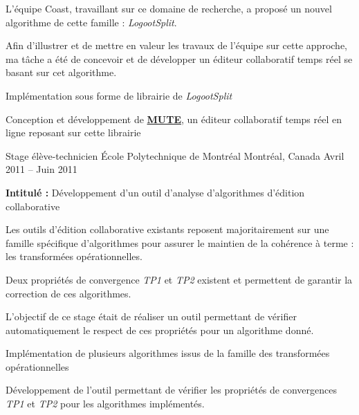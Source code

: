 \documentclass[12pt, a4paper]{awesome-cv}
\begin{document}
\begin{cventries}
\begin{cvparagraph}
    L'équipe Coast, travaillant sur ce domaine de recherche, a proposé un nouvel algorithme de cette famille : \emph{LogootSplit}.

    Afin d'illustrer et de mettre en valeur les travaux de l'équipe sur cette approche,
    ma tâche a été de concevoir et de développer un éditeur collaboratif temps réel se basant sur cet algorithme.

    \begin{tightemize}
      \item Implémentation sous forme de librairie de \emph{LogootSplit}
      \item Conception et développement de \href{https://www.coedit.re}{\textbf{MUTE}}, un éditeur collaboratif temps réel en ligne reposant sur cette librairie
    \end{tightemize}
  \end{cvparagraph}

\cventry
  {Stage élève-technicien} %
  {École Polytechnique de Montréal} %
  {Montréal, Canada} %
  {Avril 2011 – Juin 2011} %
  {
    \begin{cvitems} %
      \item {\textbf{Intitulé :}  Développement d’un outil d'analyse d'algorithmes d'édition collaborative}
    \end{cvitems}
  }

\begin{cvparagraph}
  Les outils d'édition collaborative existants reposent majoritairement sur une famille spécifique d'algorithmes pour assurer le maintien de la cohérence à terme : les transformées opérationnelles.

  Deux propriétés de convergence \emph{TP1} et \emph{TP2} existent et permettent de garantir la correction de ces algorithmes.

  L'objectif de ce stage était de réaliser un outil permettant de vérifier automatiquement le respect de ces propriétés pour un algorithme donné.
  \begin{tightemize}
    \item Implémentation de plusieurs algorithmes issus de la famille des transformées opérationnelles
    \item Développement de l'outil permettant de vérifier les propriétés de convergences \emph{TP1} et \emph{TP2} pour les algorithmes implémentés.
  \end{tightemize}
\end{cvparagraph}

\end{cventries}
\end{document}
